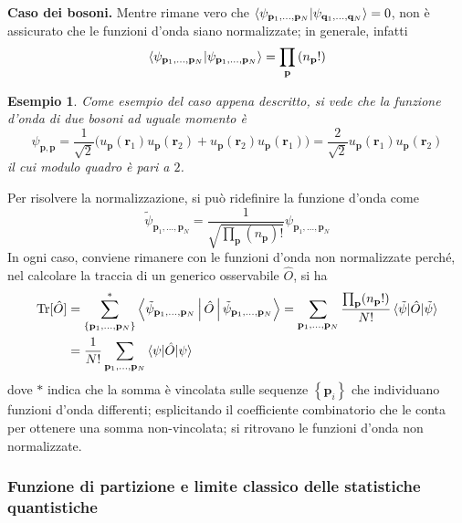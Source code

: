 \documentclass[11pt, a4paper]{scrartcl}
\theoremstyle{style}
\newtheorem{esempio}{Esempio}[section]
\theoremstyle{style1}
\numberwithin{equation}{subsection}
\begin{document}
\textbf{Caso dei bosoni.} Mentre rimane vero che $\braket{\psi _{\mathbf{p}_1,\ldots,\mathbf{p} _N }|\psi _{\mathbf{q} _1,\ldots,\mathbf{q} _N} } = 0$, non \`e assicurato che le funzioni d'onda siano normalizzate; in generale, infatti
\[
\braket{\psi _{\mathbf{p} _1,\ldots,\mathbf{p} _N} |\psi _{\mathbf{p} _1,\ldots,\mathbf{p} _N} } = \prod_\mathbf{p} \left(n_\mathbf{p} !\right) 
\] 
\begin{esempio}
Come esempio del caso appena descritto, si vede che la funzione d'onda di due bosoni ad uguale momento \`e
\[
\psi _{\mathbf{p} , \mathbf{p} } = \frac{1}{\sqrt{2} } \Big(u_\mathbf{p} (\mathbf{r} _1) u_\mathbf{p} (\mathbf{r} _2) + u_\mathbf{p} (\mathbf{r} _2) u_\mathbf{p} (\mathbf{r} _1)\Big) = \frac{2}{\sqrt{2} } u_\mathbf{p} (\mathbf{r} _1) u_\mathbf{p} (\mathbf{r} _2)
\] 
il cui modulo quadro \`e pari a $2$.
\end{esempio}
\noindent Per risolvere la normalizzazione, si pu\`o ridefinire la funzione d'onda come
\[
\tilde{\psi }_{\mathbf{p} _1,\ldots,\mathbf{p} _N} = \frac{1}{\sqrt{\prod_\mathbf{p} (n_\mathbf{p} )!} }\psi _{\mathbf{p} _1,...,\mathbf{p} _N} 
\] 
In ogni caso, conviene rimanere con le funzioni d'onda non normalizzate perch\'e, nel calcolare la traccia di un generico osservabile $\hat{O}$, si ha
\[
	\begin{split}
		\operatorname{Tr} [ \hat{O} ]  &= \sum_{\left\{ \mathbf{p} _1,\ldots,\mathbf{p} _N \right\} }^{*} \Braket{\tilde{\psi }_{\mathbf{p} _1,\ldots,\mathbf{p} _N} |\hat{O}|\tilde{\psi } _{\mathbf{p} _1,\ldots,\mathbf{p} _N} } = \sum_{\mathbf{p} _1,\ldots,\mathbf{p} _N}^{} \frac{\prod_\mathbf{p} (n_\mathbf{p} !)}{N!} \braket{\tilde{\psi }|\hat{O}|\tilde{\psi }} \\
					       & = \frac{1}{N!} \sum_{\mathbf{p} _1, \ldots, \mathbf{p} _N}^{} \braket{\psi |\hat{O}|\psi } 
	\end{split}
\] 
dove $*$ indica che la somma \`e vincolata sulle sequenze $\left\{ \mathbf{p} _i \right\} $ che individuano funzioni d'onda differenti; esplicitando il coefficiente combinatorio che le conta per ottenere una somma non-vincolata; si ritrovano le funzioni d'onda non normalizzate.
\subsubsection{Funzione di partizione e limite classico delle statistiche quantistiche}
\end{document}
